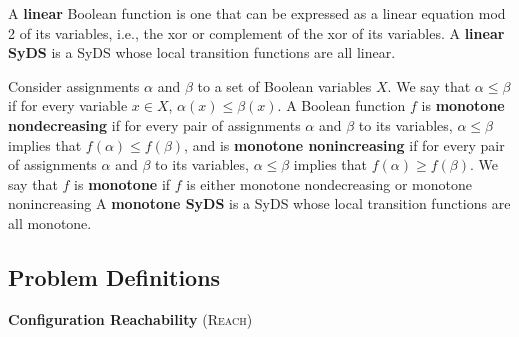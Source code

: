 A {\bf linear} Boolean function is one that can be expressed as a linear equation mod 2 of its variables,
i.e., the xor or complement of the xor of its variables.
A {\bf linear SyDS} is a SyDS whose local transition functions are all linear.

Consider assignments $\alpha$ and $\beta$ to a set of Boolean variables $X$.
We say that $\alpha \leq \beta$ if for every variable $x \in X$, $\alpha(x) \leq \beta(x)$.
A Boolean function $f$  is {\bf monotone nondecreasing}
if for every pair of assignments $\alpha$ and $\beta$ to its variables,
$\alpha \leq \beta$ implies that $f(\alpha) \leq f(\beta)$,
and is {\bf monotone nonincreasing}
if for every pair of assignments $\alpha$ and $\beta$ to its variables,
$\alpha \leq \beta$ implies that $f(\alpha) \geq f(\beta)$.
We say that $f$ is {\bf monotone} if $f$ is either monotone nondecreasing or monotone nonincreasing
A {\bf monotone SyDS} is a SyDS whose local transition functions are all monotone.


\iffalse
\medskip
\noindent
\textbf{Predecessor Existence} (\pre)

\smallskip
\noindent
\underline{\textsf{Instance:}}~ A SyDS \cals{} specified 
by an underlying
graph $G(V,E)$ and a local transition function $f_v$ for each node $v \in V$;
a configuration \calc{} for \cals.

\smallskip
\noindent
\underline{\textsf{Question:}}~ Does \calc{} have a predecessor, 
that is, is there
a configuration \calcp{} such that \cals{} has a one step transition
from \calcp{} to \calc?  

\medskip
The corresponding counting problem (i.e., finding the number
of predecessors of \calc) will be denoted by \npre.

\medskip
\noindent
\textbf{Fixed Point Existence} (\textsc{Fixed Point})

\smallskip
\noindent
\underline{\textsf{Instance:}}~ A SyDS \cals{} specified 
by an underlying
graph $G(V,E)$ and a local transition function $f_v$ for each node $v \in V$.

\smallskip
\noindent
\underline{\textsf{Question:}}~ Does \cals{} have a fixed point?  
\fi

\subsection{Problem Definitions}
\label{sse:prob_def}

\smallskip
\noindent
\textbf{Configuration Reachability} (\textsc{Reach})

